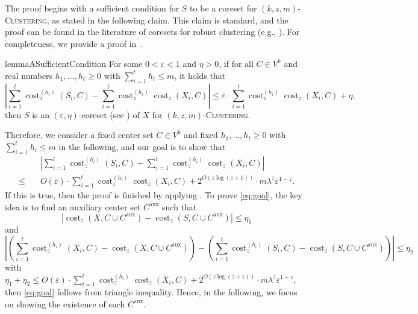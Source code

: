 \documentclass[letterpaper,11pt]{article}
\theoremstyle{plain}
\theoremstyle{definition}
\theoremstyle{remark}
\DeclareMathOperator{\cost}{cost}
\newcommand{\eps}{\varepsilon}
\newcommand{\aux}{\mathrm{aux}}
\newcommand{\ProblemName}[1]{\textsc{#1}}
\newcommand{\kzmC}{\ProblemName{$(k,z,m)$-Clustering}\xspace}
\begin{document}
The proof begins with a sufficient condition for $S$ to be a coreset for \kzmC, as stated in the following claim. This claim is standard, and the proof can be found in the literature of coresets for robust clustering (e.g., \cite{Huang2022Near-optimal,Huang2023General}). For completeness, we provide a proof in~.

\begin{restatable}{lemma}{ASufficientCondition}
    \label{claim:a sufficient condition}
    For some $0 < \eps < 1$ and $\eta > 0$,
    if for all $C\in V^k$ and real numbers $h_1,\dots, h_t\ge 0$ with $\sum_{i=1}^t h_t\le m$, it holds that 
    \begin{equation}
        \label{eq:a sufficient condition}
        \left|\sum_{i=1}^t \cost_z^{(h_i)}(S_i,C) -  \sum_{i=1}^t \cost_z^{(h_i)}\cost_z(X_i,C)\right|\le \eps\cdot \sum_{i=1}^t \cost_z^{(h_i)}\cost_z(X_i,C) + \eta,
    \end{equation}
    then $S$ is an $(\eps,\eta)$-coreset (see ) of $X$ for \kzmC.
\end{restatable}


Therefore, we consider a fixed center set $C\in V^k$ and fixed $h_1,\dots,h_t\ge 0$ with $\sum_{i=1}^th_i\le m$ in the following,
and our goal is to show that
\begin{equation}
    \label{eq:goal}
    \begin{aligned}    
    &\quad \left|\sum_{i=1}^t \cost_z^{(h_i)}(S_i,C) -  \sum_{i=1}^t \cost_z^{(h_i)}\cost_z(X_i,C)\right|\\
    \le&\quad O(\eps)\cdot \sum_{i=1}^t \cost_z^{(h_i)}\cost_z(X_i,C) + 2^{O(z\log (z+1))}\cdot m\lambda^z\eps^{1-z}.
    \end{aligned}
\end{equation}
If this is true, then the proof is finished by applying .
To prove \eqref{eq:goal},
the key idea is to find an auxiliary center set $C^\aux$ such that 
\begin{equation}
    \label{eq:bound 1}
    \left|\cost_z(X,C\cup C^\aux) - \cost_z(S,C\cup C^\aux) \right|\le \eta_1
\end{equation}
and 
\begin{equation}
    \label{eq:bound 2}
    \left|\left(\sum_{i=1}^t\cost_z^{(h_i)}(X_i,C) - \cost_z(X,C\cup C^\aux) \right) - \left(\sum_{i=1}^t\cost_z^{(h_i)}(S_i,C) - \cost_z(S,C\cup C^\aux) \right) \right|\le \eta_2
\end{equation}
with $\eta_1 + \eta_2\le O(\eps)\cdot \sum_{i=1}^t \cost_z^{(h_i)}\cost_z(X_i,C) + 2^{O(z\log (z+1))}\cdot m\lambda^z\eps^{1-z}$,
then \eqref{eq:goal} follows from triangle inequality.
Hence, in the following, we focus on showing the existence of such $C^\aux$.
\end{document}
